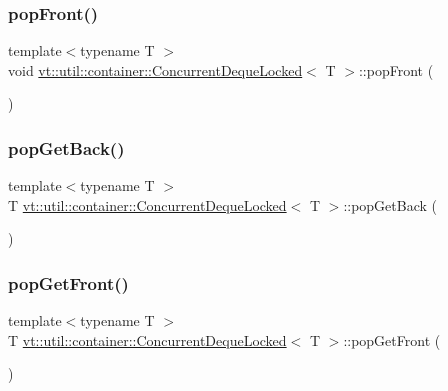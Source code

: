 \subsubsection{\texorpdfstring{pop\+Front()}{popFront()}}
{\footnotesize\ttfamily template$<$typename T $>$ \\
void \hyperlink{structvt_1_1util_1_1container_1_1_concurrent_deque_locked}{vt\+::util\+::container\+::\+Concurrent\+Deque\+Locked}$<$ T $>$\+::pop\+Front (\begin{DoxyParamCaption}{ }\end{DoxyParamCaption})}

\mbox{\label{structvt_1_1util_1_1container_1_1_concurrent_deque_locked_ad1905f8a1dc68a73ecda8bd2c332440e}} 
\subsubsection{\texorpdfstring{pop\+Get\+Back()}{popGetBack()}}
{\footnotesize\ttfamily template$<$typename T $>$ \\
T \hyperlink{structvt_1_1util_1_1container_1_1_concurrent_deque_locked}{vt\+::util\+::container\+::\+Concurrent\+Deque\+Locked}$<$ T $>$\+::pop\+Get\+Back (\begin{DoxyParamCaption}{ }\end{DoxyParamCaption})}

\mbox{\label{structvt_1_1util_1_1container_1_1_concurrent_deque_locked_aab7ffe336cd7392506121f8e3a86c1b2}} 
\subsubsection{\texorpdfstring{pop\+Get\+Front()}{popGetFront()}}
{\footnotesize\ttfamily template$<$typename T $>$ \\
T \hyperlink{structvt_1_1util_1_1container_1_1_concurrent_deque_locked}{vt\+::util\+::container\+::\+Concurrent\+Deque\+Locked}$<$ T $>$\+::pop\+Get\+Front (\begin{DoxyParamCaption}{ }\end{DoxyParamCaption})}

